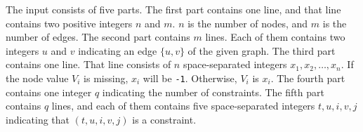 The input consists of five parts.
The first part contains one line, and that line 
contains two positive integers $n$ and $m$. 
$n$ is the number of nodes, and $m$ is the number of edges.
The second part contains $m$ lines.
Each of them contains two integers $u$ and $v$ indicating an edge $\{u, v\}$
of the given graph.
The third part contains one line.
That line consists of $n$ space-separated integers $x_1,x_2,\dots,x_n$. 
If the node value $V_i$ is missing, $x_i$ will be \verb+-1+. 
Otherwise, $V_i$ is $x_i$.
The fourth part contains one integer $q$ indicating the number of constraints.
The fifth part contains $q$ lines, and each of them contains
five space-separated integers $t, u, i, v, j$ indicating that 
$(t, u, i, v, j)$ is a constraint.
